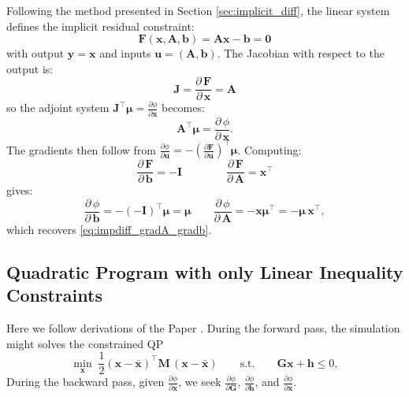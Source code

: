 \documentclass{article}
\newcommand{\pd}[2]{\dfrac{\partial\, #1}{\partial\, #2}}
\newcommand{\pdc}[2]{\frac{\partial #1}{\partial #2}}
\begin{document}
\begin{derivation}
Following the method presented in Section \ref{sec:implicit_diff}, the linear system defines the implicit residual constraint:
\begin{equation*}
    \mathbf{F}(\mathbf{x}, \mathbf{A}, \mathbf{b}) = \mathbf{A}\mathbf{x} - \mathbf{b} = \mathbf{0}
\end{equation*}
with output $\mathbf{y} = \mathbf{x}$ and inputs $\mathbf{u} = (\mathbf{A}, \mathbf{b})$.
The Jacobian with respect to the output is:
\begin{equation*}
    \mathbf{J} = \pd{\mathbf{F}}{\mathbf{x}} = \mathbf{A}
\end{equation*}
so the adjoint system $\mathbf{J}^\top\boldsymbol{\mu} = \pdc{\phi}{\mathbf{x}}$ becomes:
\begin{equation*}
    \mathbf{A}^\top\boldsymbol{\mu} = \pd{\phi}{\mathbf{x}}.
\end{equation*}
The gradients then follow from $\pdc{\phi}{\mathbf{u}} = -(\pdc{\mathbf{F}}{\mathbf{u}})^\top\boldsymbol{\mu}$.
Computing: 
\begin{equation*}
\pd{\mathbf{F}}{\mathbf{b}} = -\mathbf{I} 
\qquad\qquad
\pd{\mathbf{F}}{\mathbf{A}} = \mathbf{x}^\top 
\end{equation*}
gives:
\begin{equation*}
    \pd{\phi}{\mathbf{b}} = -(-\mathbf{I})^\top\boldsymbol{\mu} = \boldsymbol{\mu}
    \qquad
    \pd{\phi}{\mathbf{A}} = -\mathbf{x}\boldsymbol{\mu}^\top = -\boldsymbol{\mu}\,\mathbf{x}^\top,
\end{equation*}
which recovers \eqref{eq:impdiff_gradA_gradb}.
\end{derivation}

\subsection{Quadratic Program with only Linear Inequality Constraints}
Here we follow derivations of the Paper \cite{liang2019differentiable}. During the forward pass, the simulation might solves the constrained QP
\begin{equation*}
    \min_{\mathbf{x}}\; \frac{1}{2}(\mathbf{x} - \bar{\mathbf{x}})^\top \mathbf{M}\, (\mathbf{x} - \bar{\mathbf{x}})
    \qquad 
    \text{s.t.}
    \qquad
    \mathbf{G}\mathbf{x}+\mathbf{h} \leq 0,
\end{equation*}
During the backward pass, given $\pdc{\phi}{\mathbf{x}}$, we seek $\pdc{\phi}{\mathbf{G}}$, $\pdc{\phi}{\mathbf{h}}$, and $\pdc{\phi}{\bar{\mathbf{x}}}$.
\end{document}
